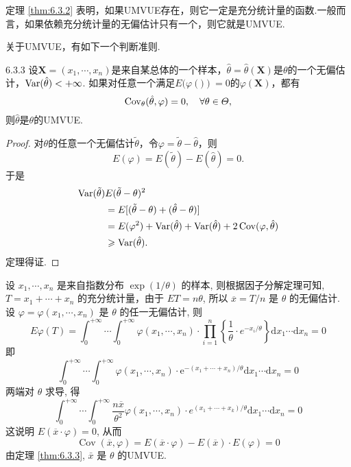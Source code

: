 定理 \ref{thm:6.3.2} 表明，如果UMVUE存在，则它一定是充分统计量的函数.一般而言，如果依赖充分统计量的无偏估计只有一个，则它就是UMVUE.

关于UMVUE，有如下一个判断准则.
\begin{theorem}{}{6.3.3}
  设$\boldsymbol X=(x_1,\cdots,x_n)$是来自某总体的一个样本，$\hat\theta=\hat\theta(\boldsymbol X)$是$\theta$的一个无偏估计，$\operatorname{Var}(\hat\theta)<+\infty$. 如果对任意一个满足$E(\varphi(\boldsymbol))=0$的$\varphi(\boldsymbol X)$，都有
  \begin{equation}\label{eq6.3.6}
    \operatorname{Cov}_\theta(\hat\theta,\varphi) = 0,\quad \forall \theta \in\varTheta,
  \end{equation}
  则$\hat\theta$是$\theta$的UMVUE.
\end{theorem}

\begin{proof}
  对$\theta$的任意一个无偏估计$\tilde\theta$，令$\varphi=\tilde\theta-\hat\theta$，则
  \[
    E(\varphi) = E(\tilde\theta) - E(\hat\theta) = 0.
  \]
  于是
  \begin{align*}
    \operatorname{Var}(\tilde \theta) & E(\tilde \theta - \theta) ^2 \\
    & = E [(\tilde \theta - \theta) + (\hat\theta - \theta)] \\
    & = E(\varphi^2) + \operatorname{Var}(\hat\theta) + \operatorname{Var}(\hat\theta) + 2\operatorname{Cov}(\varphi,\hat\theta) \\
    & \geqslant \operatorname{Var}(\hat\theta).
  \end{align*}
  定理得证.
\end{proof}

\begin{example}
设 $x_{1}, \cdots, x_{n}$ 是来自指数分布 $\exp(1/\theta)$ 的样本, 则根据因子分解定理可知, $T=x_{1}+\cdots+x_{n}$ 的充分统计量，由于 $ET=n\theta$, 所以 $\overline{x}=T / n$ 是 $\theta$ 的无偏估计. 设 $\varphi=\varphi\left(x_{1}, \cdots, x_{n}\right)$ 是 $\theta$ 的任一无偏估计, 则
\[
E \varphi(T)=\int_{0}^{+\infty} \cdots \int_{0}^{+\infty} \varphi\left(x_{1}, \cdots, x_{n}\right) \cdot \prod_{i=1}^{n}\left\{\frac{1}{\theta} \cdot e^{-x_{i} / \theta}\right\} \mathrm{d} x_{1} \cdots \mathrm{d} x_{n}=0
\]
即
\[
\int_{0}^{+\infty} \cdots \int_{0}^{+\infty} \varphi\left(x_{1}, \cdots, x_{n}\right) \cdot \mathrm{e}^{-\left(x_{1}+\cdots+x_{n}\right) / \theta} \mathrm{d} x_{1} \cdots \mathrm{d} x_{n}=0
\]
两端对 $\theta$ 求导, 得
\[
\int_{0}^{+\infty} \cdots \int_{0}^{+\infty} \frac{n \overline{x}}{\theta^{2}} \varphi\left(x_{1}, \cdots, x_{n}\right) \cdot e^{\left(x_{1}+\cdots+x_{k}\right) / \theta} \mathrm{d} x_{1} \cdots \mathrm{d} x_{n}=0
\]
这说明 $E(\overline{x} \cdot \varphi)=0$, 从而
\[
\operatorname{Cov}(\overline{x}, \varphi)=E(\overline{x} \cdot \varphi)-E(\overline{x}) \cdot E(\varphi)=0
\]
由定理 \ref{thm:6.3.3}, $\bar x$ 是 $\theta$ 的UMVUE.
\end{example}

